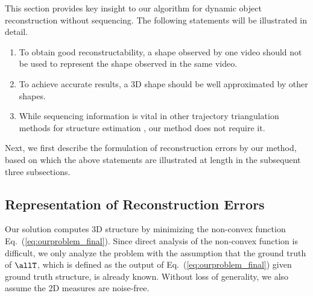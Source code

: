 This section provides key insight to our algorithm for dynamic object reconstruction without sequencing. %
The following statements will be illustrated in detail.
\begin{enumerate}
\item To obtain good reconstructability, a shape observed by one video should not be used to represent the shape observed in the same video. 
\item To achieve accurate results, a 3D shape should be well approximated by other shapes.
\item While sequencing information is vital in other trajectory triangulation methods for structure estimation \cite{Park_ECCV2010,Valmadre_CVPR2012}, our method does not require it.
\end{enumerate} 
Next, we first describe the formulation of reconstruction errors by our method, based on which the above statements are illustrated at length in the subsequent three subsections.

\subsection{Representation of Reconstruction Errors}
Our solution computes 3D structure by minimizing the non-convex function Eq.~(\ref{eq:ourproblem_final}).
Since direct analysis of the non-convex function is difficult, we only analyze the problem with the assumption that the ground truth of $\allT$, which is defined as the output of Eq.~(\ref{eq:ourproblem_final}) given ground truth structure, is already known. 
Without loss of generality, we also assume the 2D measures are noise-free.

